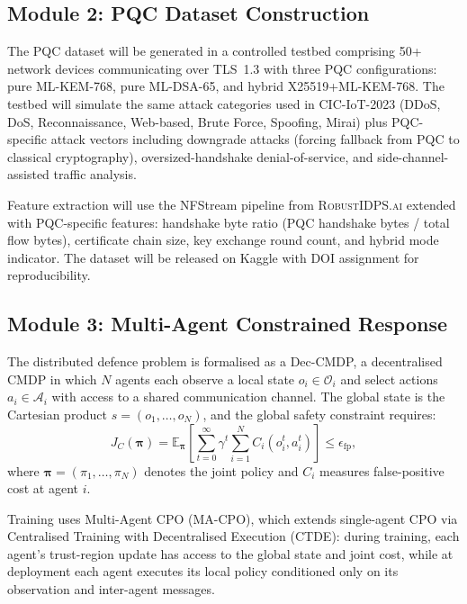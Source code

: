 \documentclass[12pt,a4paper]{article}
\newcommand{\RobustIDPS}{\textsc{RobustIDPS.ai}}
\theoremstyle{definition}
\begin{document}
\subsection{Module 2: PQC Dataset Construction}

The PQC dataset will be generated in a controlled testbed comprising 50+ network devices communicating over TLS~1.3 with three PQC configurations: pure ML-KEM-768, pure ML-DSA-65, and hybrid X25519+ML-KEM-768. The testbed will simulate the same attack categories used in CIC-IoT-2023 (DDoS, DoS, Reconnaissance, Web-based, Brute Force, Spoofing, Mirai) plus PQC-specific attack vectors including downgrade attacks (forcing fallback from PQC to classical cryptography), oversized-handshake denial-of-service, and side-channel-assisted traffic analysis.

Feature extraction will use the NFStream pipeline from \RobustIDPS{} extended with PQC-specific features: handshake byte ratio (PQC handshake bytes / total flow bytes), certificate chain size, key exchange round count, and hybrid mode indicator. The dataset will be released on Kaggle with DOI assignment for reproducibility.

\subsection{Module 3: Multi-Agent Constrained Response}

The distributed defence problem is formalised as a Dec-CMDP, a decentralised CMDP in which $N$ agents each observe a local state $o_i \in \mathcal{O}_i$ and select actions $a_i \in \mathcal{A}_i$ with access to a shared communication channel. The global state is the Cartesian product $s = (o_1, \ldots, o_N)$, and the global safety constraint requires:
\begin{equation}
J_C(\boldsymbol{\pi}) = \mathbb{E}_{\boldsymbol{\pi}}\left[\sum_{t=0}^{\infty} \gamma^t \sum_{i=1}^{N} C_i(o_i^t, a_i^t)\right] \leq \epsilon_{\mathrm{fp}},
\end{equation}
where $\boldsymbol{\pi} = (\pi_1, \ldots, \pi_N)$ denotes the joint policy and $C_i$ measures false-positive cost at agent $i$.

Training uses Multi-Agent CPO (MA-CPO), which extends single-agent CPO via Centralised Training with Decentralised Execution (CTDE): during training, each agent's trust-region update has access to the global state and joint cost, while at deployment each agent executes its local policy conditioned only on its observation and inter-agent messages.
\end{document}
